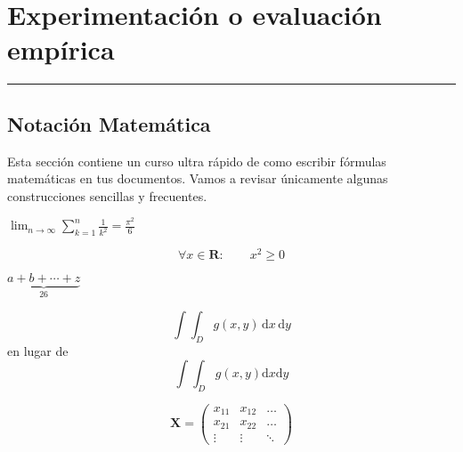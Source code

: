 \chapter{Experimentación o evaluación empírica}
\hrule \bigskip \vspace*{1cm}




\section{Notación Matemática}

Esta sección contiene un curso ultra rápido de como escribir
fórmulas matemáticas en tus documentos. Vamos a revisar únicamente
algunas construcciones sencillas y frecuentes.

$\lim_{n \to \infty} \sum_{k=1}^n \frac{1}{k^2} = \frac{\pi^2}{6}$

\begin{equation}
\forall x \in \mathbf{R}: \qquad x^{2} \geq 0
\end{equation}

$\underbrace{ a+b+\cdots+z }_{26}$

\newcommand{\rd}{\mathrm{d}}
\begin{displaymath}
\int\!\!\!\int_{D} g(x,y) \, \rd x\, \rd y
\end{displaymath}
en lugar de
\begin{displaymath}
\int\int_{D} g(x,y)\rd x \rd y
\end{displaymath}


\begin{displaymath}
\mathbf{X} = \left( \begin{array}{ccc}
x_{11} & x_{12} & \ldots \\
x_{21} & x_{22} & \ldots \\
\vdots & \vdots & \ddots
\end{array} \right)
\end{displaymath}
